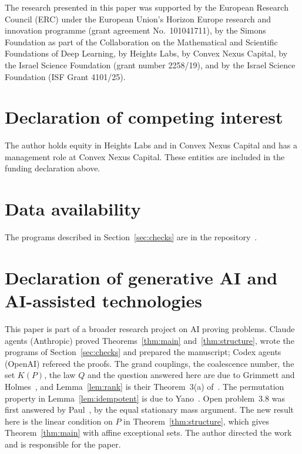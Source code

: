 \documentclass[11pt]{amsart}
\theoremstyle{remark}
\begin{document}
The research presented in this paper was supported by the European Research Council (ERC) under the European Union's
Horizon Europe research and innovation programme (grant agreement No.~101041711), by the Simons Foundation as part of
the Collaboration on the Mathematical and Scientific Foundations of Deep Learning, by Heights Labs, by Convex Nexus
Capital, by the Israel Science Foundation (grant number 2258/19), and by the Israel Science Foundation (ISF Grant
4101/25).

\section*{Declaration of competing interest}
The author holds equity in Heights Labs and in Convex Nexus Capital and has a management role at Convex Nexus Capital.
These entities are included in the funding declaration above.

\section*{Data availability}
The programs described in Section~\ref{sec:checks} are in the repository~\cite{Repo}.

\section*{Declaration of generative AI and AI-assisted technologies}
This paper is part of a broader research project on AI proving problems. Claude agents (Anthropic) proved
Theorems~\ref{thm:main} and~\ref{thm:structure}, wrote the programs of Section~\ref{sec:checks} and prepared the
manuscript; Codex agents (OpenAI) refereed the proofs. The grand couplings, the coalescence number, the set $K(P)$, the
law $Q$ and the question answered here are due to Grimmett and Holmes~\cite{GH21,GH26}, and Lemma~\ref{lem:rank} is
their Theorem~3(a) of~\cite{GH21}. The permutation property in Lemma~\ref{lem:idempotent} is due to Yano~\cite{Yan13}.
Open problem~3.8 was first answered by Paul~\cite{Pau26}, by the equal stationary mass argument. The new result
here is the linear condition on $P$ in Theorem~\ref{thm:structure}, which gives Theorem~\ref{thm:main} with affine
exceptional sets. The author
directed the work
and is responsible for the paper.
\end{document}
